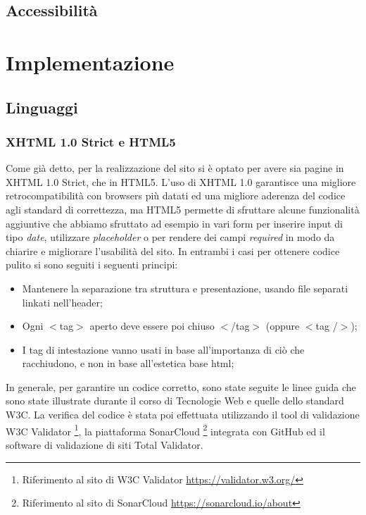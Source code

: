 \documentclass{article}
\begin{document}
		\subsection{Accessibilità}
	\section{Implementazione}
		\subsection{Linguaggi}
			\subsubsection{XHTML 1.0 Strict e HTML5}
			    Come già detto, per la realizzazione del sito si è optato per avere sia pagine in XHTML 1.0 Strict, che in HTML5. L'uso di XHTML 1.0 garantisce una migliore retrocompatibilità con browsers più datati ed una migliore aderenza del codice agli standard di correttezza, ma HTML5 permette di sfruttare alcune funzionalità aggiuntive che abbiamo sfruttato ad esempio in vari form per inserire input di tipo \textit{date}, utilizzare \textit{placeholder} o per rendere dei campi \textit{required} in modo da chiarire e migliorare l'usabilità del sito. In entrambi i casi per ottenere codice pulito si sono seguiti i seguenti principi:
			    \begin{itemize}
			        \item Mantenere la separazione tra struttura e presentazione, usando file separati linkati nell'header;
			        \item Ogni $<$tag$>$ aperto deve essere poi chiuso $<$/tag$>$ (oppure $<$tag /$>$);
			        \item I tag di intestazione vanno usati in base all'importanza di ciò che racchiudono, e non in base all'estetica base html;
			    \end{itemize}
			    
			     In generale, per garantire un codice corretto, sono state seguite le linee guida che sono state illustrate durante il corso di Tecnologie Web e quelle dello standard W3C. La verifica del codice è stata poi effettuata  utilizzando il tool di validazione W3C Validator%
			    \footnote{Riferimento al sito di W3C Validator \url{https://validator.w3.org/}},
			    la piattaforma SonarCloud 
			    \footnote{Riferimento al sito di SonarCloud \url{https://sonarcloud.io/about}}
			    integrata con GitHub
			    ed il software di validazione di siti Total Validator.%
\end{document}
